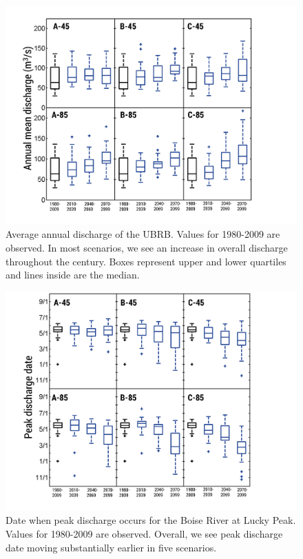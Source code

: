 \documentclass[water,article,submit,moreauthors,pdftex,10pt,a4paper]{mdpi}
\theoremstyle{mdpi}
\newcounter{ex}
\newcounter{re}
\theoremstyle{mdpidefinition}
\begin{document}
\begin{figure}
\centering
\includegraphics[width=\textwidth]{figure-files/figure8.png}
\caption{Average annual discharge of the UBRB. Values for 1980-2009 are observed. In most scenarios, we see an increase in overall discharge throughout the century. Boxes represent upper and lower quartiles and lines inside are the median.}
\label{fig:BoxPlotDischarge}
\end{figure}
\clearpage

\begin{figure}
\centering
\includegraphics[width=\textwidth]{figure-files/figure9.png}
\caption{Date when peak discharge occurs for the Boise River at Lucky Peak. Values for 1980-2009 are observed. Overall, we see peak discharge date moving substantially earlier in five scenarios.}
\label{fig:PeakDischargeDate}
\end{figure}
\clearpage
\end{document}

